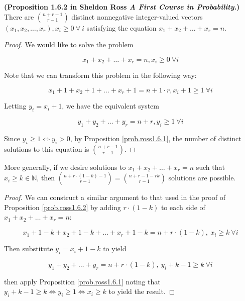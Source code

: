 \begin{proposition} \label{prob.ross1.6.2} \textbf{(Proposition 1.6.2 in Sheldon Ross \textit{A First Course in Probability}.)} There are \(\binom{n+r-1}{r-1}\) distinct nonnegative integer-valued vectors \((x_1, x_2, \ldots, x_r), x_i \geq 0 \ \forall \ i\) satisfying the equation \(x_1 + x_2 + \ldots + x_r = n\).

\end{proposition}

\begin{proof}We would like to solve the problem

\[
x_1  + x_2 + \ldots + x_r  = n , x_i  \geq 0 \ \forall i
\]

Note that we can transform this problem in the following way:

\[
x_1 + 1 + x_2 + 1 + \ldots + x_r + 1 = n + 1 \cdot r, x_i + 1 \geq 1 \ \forall i
\]

Letting \(y_i = x_i + 1\), we have the equivalent system

\[
y_1 + y_2 + \ldots + y_r = n + r, y_i \geq 1 \ \forall i
\]

Since \(y_i \geq 1 \iff y_i > 0\), by Proposition \ref{prob.ross1.6.1}, the number of distinct solutions to this equation is \(\binom{n+r-1}{r-1}  \).

\end{proof}

\begin{proposition}\label{prob.ross1.6.2general} More generally, if we desire solutions to \(x_1 + x_2 + \ldots + x_r = n\) such that  \(x_i \geq k \in \mathbb{N}\), then \(\binom{n + r\cdot(1-k)-1}{r-1} = \binom{n + r - 1 - rk}{r-1}\) solutions are possible.

\end{proposition}

\begin{proof}
We can construct a similar argument to that used in the proof of Proposition \ref{prob.ross1.6.2} by adding \(r \cdot(1-k) \) to each side of \(x_1 + x_2 + \ldots + x_r = n\):

\[
x_1 + 1 - k + x_2 + 1 - k + \ldots + x_r  + 1 - k= n + r\cdot(1-k), \ x_i \geq k \ \forall i
\]

Then substitute \(y_i = x_i + 1 - k\) to yield 

\[
y_1+ y_2 + \ldots + y_ r = n + r\cdot(1-k), \ y_i + k - 1\geq k \ \forall i
\]

then apply Proposition \ref{prob.ross1.6.1} noting that \(y_i + k - 1\geq k \iff y_i \geq 1 \iff x_i \geq k\) to yield the result.
\end{proof}

